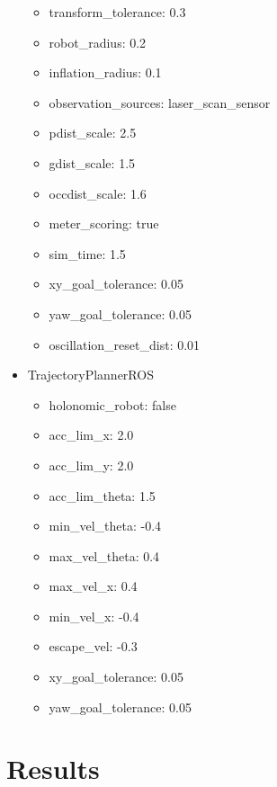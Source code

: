 \documentclass[10pt,journal,compsoc]{IEEEtran}
\begin{document}
\begin{itemize}
\begin{itemize}
\item transform\_tolerance: 0.3

\item robot\_radius: 0.2
\item inflation\_radius: 0.1

\item observation\_sources: laser\_scan\_sensor

\item pdist\_scale: 2.5
\item gdist\_scale: 1.5
\item occdist\_scale: 1.6

\item meter\_scoring: true

\item sim\_time: 1.5

\item xy\_goal\_tolerance: 0.05
\item yaw\_goal\_tolerance: 0.05

\item oscillation\_reset\_dist: 0.01

\end{itemize}

\item TrajectoryPlannerROS
\begin{itemize}
\item   holonomic\_robot: false
 \item  acc\_lim\_x: 2.0
  \item acc\_lim\_y: 2.0

 \item  acc\_lim\_theta: 1.5

  \item min\_vel\_theta: -0.4
  \item max\_vel\_theta: 0.4

  \item max\_vel\_x: 0.4
  \item min\_vel\_x: -0.4
  
  \item escape\_vel: -0.3
  

  \item xy\_goal\_tolerance: 0.05
  \item yaw\_goal\_tolerance: 0.05
\end{itemize}
\end{itemize}



\section{Results}
\end{document}
